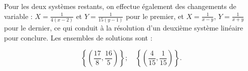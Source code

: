 {{Pour les deux systèmes restants, on effectue également des changements de variable : $X=\frac{1}{4(x-2)}$ et $Y=\frac{1}{15(y-1)}$ pour le premier, et $X=\frac{1}{x-y}$, $Y=\frac{1}{x+y}$ pour le dernier, ce qui conduit à la résolution d'un deuxième système linéaire pour conclure. Les ensembles de solutions sont :

\[ 
\left\{ \left(\frac{17}{8},\frac{16}{5}\right)\right\}; \quad 
\left\{ \left(\frac{4}{15},\frac{1}{15}\right)\right\}.
\]}
}